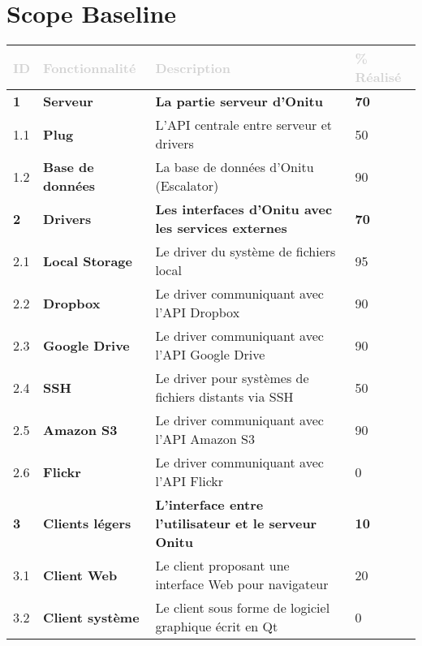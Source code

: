 \renewcommand{\chaptername}{}
\renewcommand{\thechapter}{}

\chapter{Scope Baseline}

\setlength{\tabcolsep}{8pt}
\renewcommand{\arraystretch}{1.5}

\begin{center}\begin{tabular}{|l l|l|l|}

\hline
\rowcolor{epiBlue}
\rowstyle{ \color{gray} \bfseries}
\textcolor{lightGray}{\textbf{ID}} & \textcolor{lightGray}{\textbf{Fonctionnalité}} & \textcolor{lightGray}{\textbf{Description}} & \textcolor{lightGray}{\textbf{\% Réalisé}} \tabularnewline
\hline
\rowcolor{lightGray}
	\textbf{1} & \textbf{Serveur} & \textbf{La partie serveur d'Onitu} & \textbf{70} \tabularnewline
\hline
	1.1 & \textbf{Plug} & L'API centrale entre serveur et drivers & 50 \tabularnewline
\hline
	1.2 & \textbf{Base de données} & La base de données d'Onitu (Escalator) & 90 \tabularnewline
\hline
\rowcolor{lightGray}
	\textbf{2} & \textbf{Drivers} & \textbf{Les interfaces d'Onitu avec les services externes} & \textbf{70} \tabularnewline
\hline
	2.1 & \textbf{Local Storage} & Le driver du système de fichiers local & 95 \tabularnewline
\hline
	2.2 & \textbf{Dropbox} & Le driver communiquant avec l'API Dropbox & 90 \tabularnewline
\hline
	2.3 & \textbf{Google Drive} & Le driver communiquant avec l'API Google Drive & 90 \tabularnewline
\hline
	2.4 & \textbf{SSH} & Le driver pour systèmes de fichiers distants via SSH & 50 \tabularnewline
\hline
	2.5 & \textbf{Amazon S3} & Le driver communiquant avec l'API Amazon S3 & 90 \tabularnewline
\hline
	2.6 & \textbf{Flickr} & Le driver communiquant avec l'API Flickr & 0 \tabularnewline
\hline
\rowcolor{lightGray}
	\textbf{3} & \textbf{Clients légers} & \textbf{L'interface entre l'utilisateur et le serveur Onitu} & \textbf{10} \tabularnewline
\hline
	3.1 & \textbf{Client Web} & Le client proposant une interface Web pour navigateur & 20 \tabularnewline
\hline
	3.2 & \textbf{Client système} & Le client sous forme de logiciel graphique écrit en Qt & 0 \tabularnewline

\hline
\end{tabular}\end{center}
